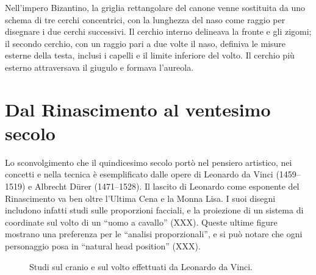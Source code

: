 Nell'impero Bizantino, la griglia rettangolare del canone venne sostituita da uno schema di tre cerchi concentrici, con la lunghezza del naso come raggio per disegnare i due cerchi successivi. Il cerchio interno delineava la fronte e gli zigomi; il secondo cerchio, con un raggio pari a due volte il naso, definiva le misure esterne della testa, inclusi i capelli e il limite inferiore del volto. Il cerchio più esterno attraversava il giugulo e formava l'aureola.

\section{Dal Rinascimento al ventesimo secolo}
Lo sconvolgimento che il quindicesimo secolo portò nel pensiero artistico, nei concetti e nella tecnica è esemplificato dalle opere di Leonardo da Vinci (1459--1519) e Albrecht Dürer (1471--1528). Il lascito di Leonardo come esponente del Rinascimento va ben oltre l'Ultima Cena e la Monna Lisa. I suoi disegni includono infatti studi sulle proporzioni facciali, e la proiezione di un sistema di coordinate sul volto di un ``uomo a cavallo'' (XXX). Queste ultime figure mostrano una preferenza per le ``analisi proporzionali'', e si può notare che ogni personaggio posa in ``natural head position'' (XXX).

\begin{figure}[h!]
\centering
{} \quad
{}
\caption{Studi sul cranio e sul volto effettuati da Leonardo da Vinci.}
\label{fig:leonardo}
\end{figure}

